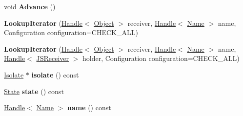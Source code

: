 \begin{DoxyCompactItemize}
\item 
\hypertarget{classv8_1_1internal_1_1_b_a_s_e___e_m_b_e_d_d_e_d_a4b06fdbbb29fc7d6641a995803b6d7ec}{}void {\bfseries Advance} ()\label{classv8_1_1internal_1_1_b_a_s_e___e_m_b_e_d_d_e_d_a4b06fdbbb29fc7d6641a995803b6d7ec}

\item 
\hypertarget{classv8_1_1internal_1_1_b_a_s_e___e_m_b_e_d_d_e_d_a44ebb2ef2c964f874dacb1503f0c613d}{}{\bfseries Lookup\+Iterator} (\hyperlink{classv8_1_1internal_1_1_handle}{Handle}$<$ \hyperlink{classv8_1_1internal_1_1_object}{Object} $>$ receiver, \hyperlink{classv8_1_1internal_1_1_handle}{Handle}$<$ \hyperlink{classv8_1_1internal_1_1_name}{Name} $>$ name, Configuration configuration=C\+H\+E\+C\+K\+\_\+\+A\+L\+L)\label{classv8_1_1internal_1_1_b_a_s_e___e_m_b_e_d_d_e_d_a44ebb2ef2c964f874dacb1503f0c613d}

\item 
\hypertarget{classv8_1_1internal_1_1_b_a_s_e___e_m_b_e_d_d_e_d_ab6f4527277c06ae6a62ae694e052e155}{}{\bfseries Lookup\+Iterator} (\hyperlink{classv8_1_1internal_1_1_handle}{Handle}$<$ \hyperlink{classv8_1_1internal_1_1_object}{Object} $>$ receiver, \hyperlink{classv8_1_1internal_1_1_handle}{Handle}$<$ \hyperlink{classv8_1_1internal_1_1_name}{Name} $>$ name, \hyperlink{classv8_1_1internal_1_1_handle}{Handle}$<$ \hyperlink{classv8_1_1internal_1_1_j_s_receiver}{J\+S\+Receiver} $>$ holder, Configuration configuration=C\+H\+E\+C\+K\+\_\+\+A\+L\+L)\label{classv8_1_1internal_1_1_b_a_s_e___e_m_b_e_d_d_e_d_ab6f4527277c06ae6a62ae694e052e155}

\item 
\hypertarget{classv8_1_1internal_1_1_b_a_s_e___e_m_b_e_d_d_e_d_aafca7727b44748c75ff39a90282dfb8d}{}\hyperlink{classv8_1_1internal_1_1_isolate}{Isolate} $\ast$ {\bfseries isolate} () const \label{classv8_1_1internal_1_1_b_a_s_e___e_m_b_e_d_d_e_d_aafca7727b44748c75ff39a90282dfb8d}

\item 
\hypertarget{classv8_1_1internal_1_1_b_a_s_e___e_m_b_e_d_d_e_d_a6aff3a07409478069efc68088440baf1}{}\hyperlink{structv8_1_1internal_1_1_b_a_s_e___e_m_b_e_d_d_e_d_1_1_state}{State} {\bfseries state} () const \label{classv8_1_1internal_1_1_b_a_s_e___e_m_b_e_d_d_e_d_a6aff3a07409478069efc68088440baf1}

\item 
\hypertarget{classv8_1_1internal_1_1_b_a_s_e___e_m_b_e_d_d_e_d_aff9bf84ff846b1692e177395d87d5eb5}{}\hyperlink{classv8_1_1internal_1_1_handle}{Handle}$<$ \hyperlink{classv8_1_1internal_1_1_name}{Name} $>$ {\bfseries name} () const \label{classv8_1_1internal_1_1_b_a_s_e___e_m_b_e_d_d_e_d_aff9bf84ff846b1692e177395d87d5eb5}


\end{DoxyCompactItemize}
